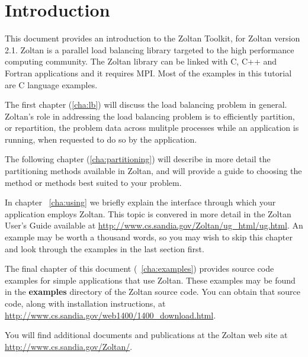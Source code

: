 %
% 
%
\chapter{Introduction}

This document provides an introduction to the Zoltan Toolkit,
for Zoltan version 2.1.  Zoltan is a parallel load balancing library
targeted to the high performance computing community.  The Zoltan
library can be
linked with C, C++ and Fortran applications and it requires MPI.  
Most of the examples in this tutorial are C language examples.

The first chapter (\ref{cha:lb})
will discuss the load balancing problem in general.
Zoltan's role in addressing the load balancing problem is to 
efficiently partition,
or repartition, the problem data across mulitple processes while an
application is running, when requested to do so by the application.

The following chapter (\ref{cha:partitioning})
will describe in more detail the partitioning
methods available in Zoltan, and will provide a guide
to choosing the method or methods best suited to your problem.

In chapter ~\ref{cha:using} we briefly explain the interface
through which your application employs Zoltan.  This topic is
convered in more detail in the
Zoltan User's Guide available at
\url{http://www.cs.sandia.gov/Zoltan/ug_html/ug.html}.
An example may be worth a thousand words, so you may wish to 
skip this chapter and look through the examples in the last section first.

The final chapter of this document (~\ref{cha:examples}) provides
source code examples for simple applications that use Zoltan.
These examples may be found in the \textbf{examples} directory
of the Zoltan source code.  You can obtain that source code,
along with installation instructions, at
\url{http://www.cs.sandia.gov/web1400/1400_download.html}.

You will find additional documents and publications at the
Zoltan web site at \url{http://www.cs.sandia.gov/Zoltan/}.

